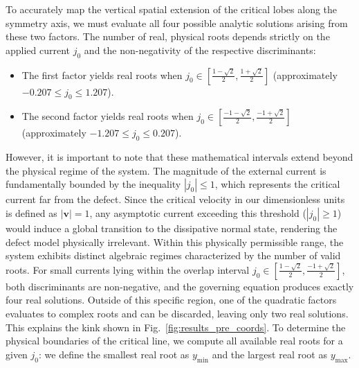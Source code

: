 \documentclass[english,binding=0.6cm,noexaminfo]{sapthesis}
\begin{document}
To accurately map the vertical spatial extension of the critical lobes along the symmetry axis, we must evaluate all four possible analytic solutions arising from these two factors. The number of real, physical roots depends strictly on the applied current $j_0$ and the non-negativity of the respective discriminants:
\begin{itemize}
    \item The first factor yields real roots when $j_0 \in \left[\frac{1 - \sqrt{2}}{2}, \frac{1 + \sqrt{2}}{2}\right]$ (approximately $-0.207 \le j_0 \le 1.207$).
    \item The second factor yields real roots when $j_0 \in \left[\frac{-1 - \sqrt{2}}{2}, \frac{-1 + \sqrt{2}}{2}\right]$ (approximately $-1.207 \le j_0 \le 0.207$).
\end{itemize}
However, it is important to note that these mathematical intervals extend beyond the physical regime of the system. The magnitude of the external current is fundamentally bounded by the inequality $|j_0| \le 1$, which represents the critical current far from the defect. Since the critical velocity in our dimensionless units is defined as $|\mathbf{v}|=1$, any asymptotic current exceeding this threshold ($|j_0| \ge 1$) would induce a global transition to the dissipative normal state, rendering the defect model physically irrelevant. Within this physically permissible range, the system exhibits distinct algebraic regimes characterized by the number of valid roots. For small currents lying within the overlap interval $j_0 \in \left[\frac{1 - \sqrt{2}}{2}, \frac{-1 + \sqrt{2}}{2}\right]$, both discriminants are non-negative, and the governing equation produces exactly four real solutions. Outside of this specific region, one of the quadratic factors evaluates to complex roots and can be discarded, leaving only two real solutions. This explains the kink shown in Fig.~\ref{fig:results_pre_coords}.
To determine the physical boundaries of the critical line, we compute all available real roots for a given $j_0$: we define the smallest real root as $y_{\text{min}}$ and the largest real root as $y_{\text{max}}$. 
\end{document}

